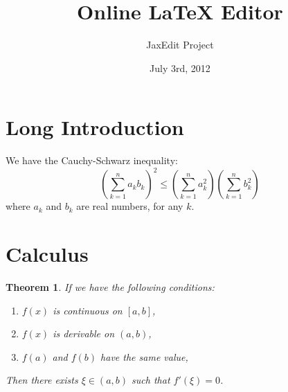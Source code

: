 \documentclass{beamer}
\newtheorem{thm}{Theorem}
\begin{document}
\title{Online LaTeX Editor}
\author{JaxEdit Project}
\date{July 3rd, 2012}
\maketitle

\tableofcontents

\section[Introduction]{Long Introduction}

\begin{frame}
We have the Cauchy-Schwarz inequality:
  \[ \left( \sum_{k=1}^n a_k b_k \right)^2 \leq \left( \sum_{k=1}^n a_k^2 \right) \left( \sum_{k=1}^n b_k^2 \right) \]
where $a_k$ and $b_k$ are real numbers, for any $k$.
\end{frame}

\section{Calculus}

\begin{frame}
\begin{thm}
If we have the following conditions:
\begin{enumerate}
\item $f(x)$ is continuous on $[a,b]$,
\item $f(x)$ is derivable on $(a,b)$,
\item $f(a)$ and $f(b)$ have the same value,
\end{enumerate}
Then there exists $\xi\in(a,b)$ such that $f'(\xi)=0$.
\end{thm}
\end{frame}
\end{document}
